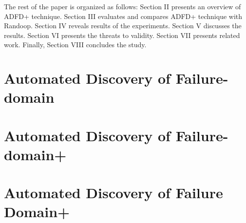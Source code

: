 \documentclass[conference]{IEEEtran}
\begin{document}
The rest of the paper is organized as follows: Section II presents an overview of ADFD+ technique. Section III evaluates and compares ADFD+ technique with Randoop. Section IV reveals results of the experiments. Section V discusses the results. Section VI presents the threats to validity. Section VII presents related work. Finally, Section VIII concludes the study.


 


\section{Automated Discovery of Failure-domain}
 



\section{Automated Discovery of Failure-domain+}



\section{Automated Discovery of Failure Domain+}\label{sec:adfd+}

\end{document}
